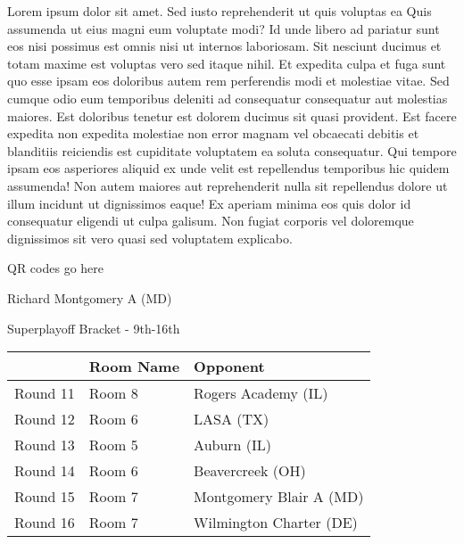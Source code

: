 \documentclass{article}%
\begin{document}
\vspace*{8pt}%
\linebreak%
\newline%
\newline%
    Lorem ipsum dolor sit amet. Sed iusto reprehenderit ut quis voluptas ea Quis assumenda ut eius magni eum voluptate modi? Id unde libero ad pariatur sunt eos nisi possimus est omnis nisi ut internos laboriosam. Sit nesciunt ducimus et totam maxime est voluptas vero sed itaque nihil. Et expedita culpa et fuga sunt quo esse ipsam eos doloribus autem rem perferendis modi et molestiae vitae.\newline%
\newline%
    Sed cumque odio eum temporibus deleniti ad consequatur consequatur aut molestias maiores. Est doloribus tenetur est dolorem ducimus sit quasi provident. Est facere expedita non expedita molestiae non error magnam vel obcaecati debitis et blanditiis reiciendis est cupiditate voluptatem ea soluta consequatur. Qui tempore ipsam eos asperiores aliquid ex unde velit est repellendus temporibus hic quidem assumenda!\newline%
\newline%
    Non autem maiores aut reprehenderit nulla sit repellendus dolore ut illum incidunt ut dignissimos eaque! Ex aperiam minima eos quis dolor id consequatur eligendi ut culpa galisum. Non fugiat corporis vel doloremque dignissimos sit vero quasi sed voluptatem explicabo.\newline%
\newline%
\vspace*{30pt}%
\begin{center}%
\begin{Huge}%
QR codes go here%
\end{Huge}%
\end{center}%
\newpage%
\begin{center}%
\begin{Huge}%
Richard Montgomery A (MD)%
\end{Huge}%
\vspace*{8pt}%
\linebreak%
\begin{Large}%
Superplayoff Bracket {-} 9th{-}16th%
\end{Large}%
\end{center}%
%
\begin{tabularx}{\textwidth}{|c|Y|Y|}%
\hline%
&Room Name&Opponent\\%
\hline%
Round 11&Room 8&Rogers Academy (IL)\\%
Round 12&Room 6&LASA (TX)\\%
Round 13&Room 5&Auburn (IL)\\%
Round 14&Room 6&Beavercreek (OH)\\%
Round 15&Room 7&Montgomery Blair A (MD)\\%
Round 16&Room 7&Wilmington Charter (DE)\\%
\hline%
\end{tabularx}%
\end{document}

